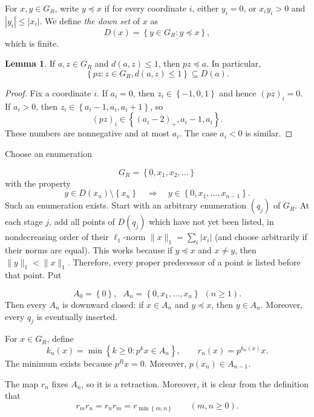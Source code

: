 \documentclass[11pt]{amsart}
\theoremstyle{definition}
\newtheorem{lemma}[theorem]{Lemma}
\newcommand{\abs}[1]{\left\lvert#1\right\rvert}
\newcommand{\set}[1]{\left\{#1\right\}}
\begin{document}
For $x,y\in G_R$, write $y\preceq x$ if for every coordinate $i$, either
$y_i=0$, or $x_i y_i>0$ and $\abs{y_i}\leq\abs{x_i}$.  We define {\em the down set} of $x$ as
$$
       D(x)=\set{y\in G_R:y\preceq x},
$$
which is finite.


\begin{lemma}\label{lem:predecessor}
If $a, z\in G_R$ and $d(a,z)\le 1$, then $pz\preceq a$. In particular, 
$$
\set{pz: z\in G_R, d(a,z)\le 1}\subseteq D(a).
$$
\end{lemma}

\begin{proof}
Fix a coordinate $i$. If $a_i=0$, then $z_i\in \set{-1, 0, 1}$ and hence $(pz)_i=0$. If $a_i>0$, then $z_i\in \set{a_i-1, a_i, a_i+1}$, so
$$
(pz)_i\in\set{(a_i-2)_+, a_i-1, a_i}.
$$
These numbers are nonnegative and at most $a_i$. The case $a_i<0$ is similar.
\end{proof}
 Choose an enumeration 

\begin{equation}\label{eq:enumeration}
       G_R=\set{0,x_1,x_2,\ldots}
\end{equation}
with the property
\begin{equation}\label{eq:downset-order}
 y\in D(x_n)\setminus\set{x_n}
 \quad\Longrightarrow\quad
 y\in\set{0,x_1,\ldots,x_{n-1}}.
\end{equation}
Such an enumeration exists. Start with an arbitrary enumeration $(q_j)$ of $G_R$. At each stage $j$, add all points of $D(q_j)$ which have not yet been listed, in nondecreasing order of their $\ell_1$-norm $\|x\|_1=\sum_i |x_i|$ (and choose arbitrarily if their norms are equal). This works because if $y\preceq x$ and $x\neq y$, then $\|y\|_1<\|x\|_1$. Therefore, every proper predecessor of a point is listed before that point. Put

$$
A_0=\set{0},\ \ \ A_n=\set{0, x_1, \ldots, x_n}\ \ (n\ge 1).
$$
Then every $A_n$ is downward closed: if $x\in A_n$ and $y\preceq x$, then
$y\in A_n$.  Moreover, every $q_j$ is eventually inserted.

 For $x\in G_R$, define
\begin{equation}\label{eq:retraction}
       k_n(x)=\min\set{k\geq0:p^k x\in A_n},
       \qquad
       r_n(x)=p^{k_n(x)}x.
\end{equation}
The minimum exists because $p^R x=0$.  Moreover,
$p(x_n)\in A_{n-1}$.

The map $r_n$ fixes $A_n$, so it is a retraction. Moreover, it is clear from the definition that
\begin{equation}\label{eq:commuting}
       r_mr_n=r_nr_m=r_{\min\set{m,n}}
       \qquad(m,n\geq0).
\end{equation}
\end{document}
